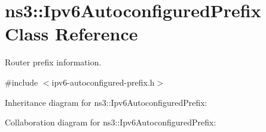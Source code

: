 \hypertarget{classns3_1_1Ipv6AutoconfiguredPrefix}{}\section{ns3\+:\+:Ipv6\+Autoconfigured\+Prefix Class Reference}
\label{classns3_1_1Ipv6AutoconfiguredPrefix}


Router prefix information.  




{\ttfamily \#include $<$ipv6-\/autoconfigured-\/prefix.\+h$>$}



Inheritance diagram for ns3\+:\+:Ipv6\+Autoconfigured\+Prefix\+:


Collaboration diagram for ns3\+:\+:Ipv6\+Autoconfigured\+Prefix\+:
